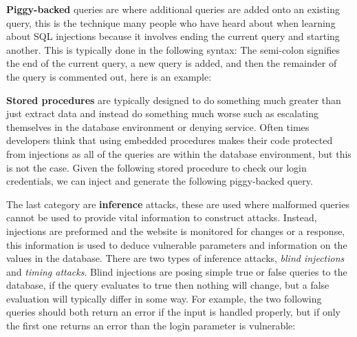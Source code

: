 
\textbf{Piggy-backed} queries are where additional queries are added onto an existing query, this is the technique many people who have heard about when learning about SQL injections because it involves ending the current query and starting another.  This is typically done in the following syntax:
 The semi-colon signifies the end of the current query, a new query is added, and then the remainder of the query is commented out, here is an example:


\textbf{Stored procedures} are typically designed to do something much greater than just extract data and instead do something much worse such as escalating themselves in the database environment or denying service.  Often times developers think that using embedded procedures makes their code protected from injections as all of the queries are within the database environment, but this is not the case. Given the following stored procedure to check our login credentials, we can inject  and generate the following piggy-backed query.



The last category are \textbf{inference} attacks, these are used where malformed queries cannot be used to provide vital information to construct attacks.  Instead, injections are preformed and the website is monitored for changes or a response, this information is used to deduce vulnerable parameters and information on the values in the database.  There are two types of inference attacks, \emph{blind injections} and \emph{timing attacks}. Blind injections are posing simple true or false queries to the database, if the query evaluates to true then nothing will change, but a false evaluation will typically differ in some way.  For example, the two following queries should both return an error if the input is handled properly, but if only the first one returns an error than the login parameter is vulnerable:  

